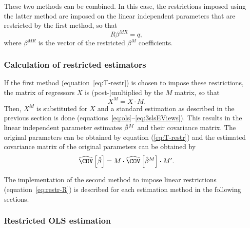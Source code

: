 These two methods can be combined.
In this case, the restrictions imposed using the latter method are
imposed on the linear independent parameters
that are restricted by the first method, so that
\begin{equation}
   R \beta^{MR} = q ,
\end{equation}
where $\beta^{MR}$ is the vector of the restricted $\beta^M$ coefficients.


\subsubsection{Calculation of restricted estimators}

If the first method (equation~\ref{eq:T-restr}) is chosen
to impose these restrictions,
the matrix of regressors $X$ is (post-)\hspace{0pt}multiplied
by the $M$ matrix,
so that
\begin{equation}
    X^M = X \cdot M .
\end{equation}
Then, $X^M$ is substituted for $X$ and a standard estimation as described
in the previous section is done
(equations~\ref{eq:ols}--\ref{eq:3slsEViews}).
This results in the linear independent parameter estimates $\hat{\beta}^M$ and
their covariance matrix.
The original parameters can be obtained by equation (\ref{eq:T-restr})
and the estimated covariance matrix of the original parameters
can be obtained by
\begin{equation}
   \COVHat \left[ \bHat \right]
   = M \cdot \COVHat \left[ \bHat^M \right] \cdot M' .
\end{equation}

The implementation of the second method to impose linear restrictions
(equation~\ref{eq:restr-R})
is described for each estimation method in the following sections.


\subsubsection{Restricted OLS estimation}

